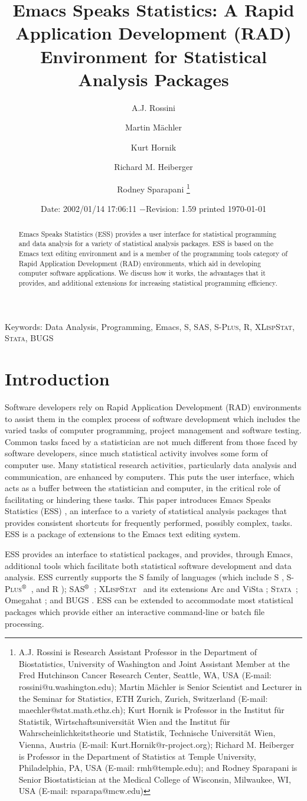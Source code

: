 \documentclass{article}
\title{Emacs Speaks Statistics:  A Rapid Application Development (RAD)
  Environment for Statistical Analysis Packages}
\author{A.J. Rossini \and Martin M{\"a}chler \and Kurt Hornik \and Richard
  M. Heiberger \and Rodney Sparapani \footnote{%
    A.J. Rossini is Research Assistant Professor in the Department of
    Biostatistics, University of Washington and Joint Assistant Member at
    the Fred Hutchinson Cancer Research Center, Seattle, WA, USA
    (E-mail: rossini@u.washington.edu);
    Martin M{\"a}chler is Senior Scientist and Lecturer in the Seminar for
    Statistics, ETH Zurich, Zurich, Switzerland
    (E-mail: maechler@stat.math.ethz.ch);
    Kurt Hornik is Professor in the Institut f{\"u}r Statistik,
    Wirtschaftsuniversit{\"a}t Wien and the Institut f{\"u}r
    Wahrscheinlichkeitstheorie und Statistik, Technische Universit{\"a}t
    Wien, Vienna, Austria (E-mail: Kurt.Hornik@r-project.org);
    Richard M. Heiberger is Professor in the Department of Statistics at
    Temple University, Philadelphia, PA, USA (E-mail: rmh@temple.edu);
    and Rodney Sparapani is Senior Biostatistician at the Medical College
    of Wisconsin, Milwaukee, WI, USA (E-mail: rsparapa@mcw.edu)}}
\date{$ $Date: 2002/01/14 17:06:11 $ - $Revision: 1.59 $ $\tiny printed \today}
\newif\ifdraft
\renewcommand{\baselinestretch}{1.5}
\newcommand*{\regstrd}{$^{\mbox{\scriptsize{\textregistered}}}$}
\newcommand*{\SAS}{\textsc{SAS}}
\newcommand*{\Splus}{\textsc{S-Plus}}
\newcommand*{\XLispStat}{\textsc{XLispStat}}
\newcommand*{\Stata}{\textsc{Stata}}
\begin{document}
\maketitle

\ifdraft{}%
\else%
 \renewcommand{\baselinestretch}{1.5}
\fi

\begin{abstract}
  Emacs Speaks Statistics (ESS) provides a user interface for
  statistical programming and data analysis for a variety of
  statistical analysis packages.  ESS is based on the Emacs text
  editing environment and is a member of the programming tools
  category of Rapid Application Development (RAD) environments, which
  aid in developing computer software applications.  We discuss how it
  works, the advantages that it provides, and additional extensions
  for increasing statistical programming efficiency.
\end{abstract}

\noindent Keywords: Data Analysis, Programming, Emacs, S, \SAS,
\Splus, R, \XLispStat, \Stata, BUGS


\section{Introduction}
\label{sec:introduction}

Software developers rely on Rapid Application Development (RAD)
environments to assist them in the complex process of software
development which includes the varied tasks of computer
programming, project management and software testing.
Common tasks faced by a statistician are not much different from those
faced by software developers, since much statistical
activity involves some form of computer use.  Many
statistical research activities, particularly data analysis and
communication, are enhanced by computers.  This puts the user
interface, which acts as a buffer between the statistician and
computer, in the critical role of facilitating or hindering these
tasks.  This paper introduces Emacs Speaks Statistics (ESS) \citep{ESS},
an interface to a variety of statistical analysis packages that
provides consistent shortcuts for frequently performed, possibly complex, tasks.
ESS is a package of extensions to the Emacs text editing system.

ESS provides an interface to statistical packages, and provides,
through Emacs, additional tools which facilitate both statistical
software development and data analysis.  ESS currently supports
the S family of languages (which include
S \citep{BecRCW88,ChaJH92,ChaJ98}, \Splus\regstrd\ \citep{Splus}, and R
\citep{ihak:gent:1996}); \SAS\regstrd\ \citep{SAS:8}; \XLispStat\
\citep{Tier90} and its extensions Arc \citep{Cook:Weisberg:1999} and
ViSta \citep{youn:fald:mcfa:1992}; \Stata\ \citep{Stata:6.0}; Omegahat
\citep{DTLang:2000}; and BUGS \citep{BUGS}.  ESS can be
extended to accommodate most statistical packages which provide either
an interactive command-line or batch file processing.
\end{document}

